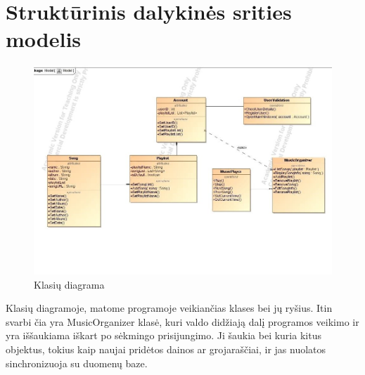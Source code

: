 \documentclass{VUMIFPSkursinis}
\begin{document}
\section{Struktūrinis dalykinės srities modelis}

\begin{figure}[H]
    \centering
    \includegraphics[scale=0.75]{img/Classes}
    \caption{Klasių diagrama}
    \label{img:class}
\end{figure}

Klasių diagramoje, matome programoje veikiančias klases bei jų ryšius. Itin svarbi čia yra MusicOrganizer klasė, kuri valdo didžiają dalį programos veikimo ir yra iššaukiama iškart po sėkmingo prisijungimo. Ji šaukia bei kuria kitus objektus, tokius kaip naujai pridėtos dainos ar grojaraščiai, ir jas nuolatos sinchronizuoja su duomenų baze.
\end{document}
